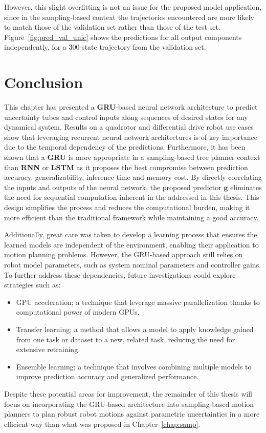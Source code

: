 However, this slight overfitting is not an issue for the proposed model application, since in the sampling-based context the trajectories encountered are more likely to match those of the validation set rather than those of the test set.
Figure~\ref{fig:pred_val_unic} shows the predictions for all output components independently, for a 300-state trajectory from the validation set.

\section{Conclusion} \label{sec:NN_concl}

This chapter has presented a \textbf{GRU}-based neural network architecture to predict uncertainty tubes and control inputs along sequences of desired states for any dynamical system.
Results on a quadrotor and differential drive robot use cases show that leveraging recurrent neural network architectures is of key importance due to the temporal dependency of the predictions.
Furthermore, it has been shown that a \textbf{GRU} is more appropriate in a sampling-based tree planner context than \textbf{RNN} or \textbf{LSTM} as it proposes the best compromise between prediction accuracy, generalizability, inference time and memory cost.
By directly correlating the inputs and outputs of the neural network, the proposed predictor $\boldsymbol{g}$ eliminates the need for sequential computation inherent in the  addressed in this thesis. 
This design simplifies the process and reduces the computational burden, making it more efficient than the traditional  framework while maintaining a good accuracy.

Additionally, great care was taken to develop a learning process that ensures the learned models are independent of the environment, enabling their application to motion planning problems. 
However, the GRU-based approach still relies on robot model parameters, such as system nominal parameters and controller gains. 
To further address these dependencies, future investigations could explore strategies such as:
\begin{itemize}
    \item GPU acceleration; a technique that leverage massive parallelization thanks to computational power of modern GPUs.
    \item Transfer learning; a method that allows a model to apply knowledge gained from one task or dataset to a new, related task, reducing the need for extensive retraining.
    \item Ensemble learning; a technique that involves combining multiple models to improve prediction accuracy and generalized performance.
\end{itemize}

Despite these potential areas for improvement, the remainder of this thesis will focus on incorporating the GRU-based architecture into sampling-based motion planners to plan robust robot motions against parametric uncertainties in a more efficient way than what was proposed in Chapter~\ref{chap:samp}.
